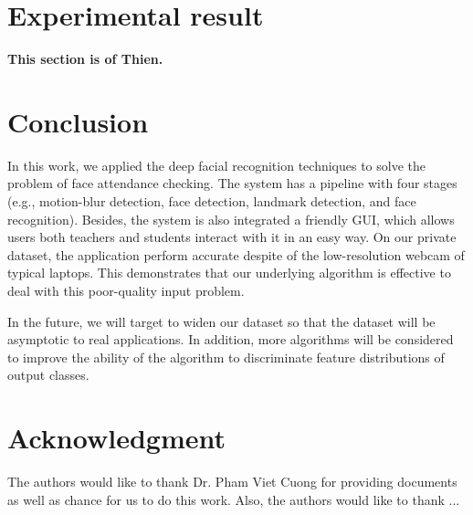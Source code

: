 \documentclass[journal, twocolumn]{IEEEtran}
\begin{document}
\medskip
\section{Experimental result}
\label{experimental-result}
\textbf{This section is of Thien.}


\medskip
\section{Conclusion}
\label{conclusion}

In this work, we applied the deep facial recognition techniques to solve the problem of face attendance checking. The system has a pipeline with four stages (e.g., motion-blur detection, face detection, landmark detection, and face recognition). Besides, the system is also integrated a friendly GUI, which allows users both teachers and students interact with it in an easy way. On our private dataset, the application perform accurate despite of the low-resolution webcam of typical laptops. This demonstrates that our underlying algorithm is effective to deal with this poor-quality input problem.

In the future, we will target to widen our dataset so that the dataset will be asymptotic to real applications. In addition, more algorithms will be considered to improve the ability of the algorithm to discriminate feature distributions of output classes.


\section*{Acknowledgment}

The authors would like to thank Dr. Pham Viet Cuong for providing documents as well as chance for us to do this work. Also, the authors would like to thank ...


\begin{thebibliography}{9}

\end{thebibliography}
\end{document}
